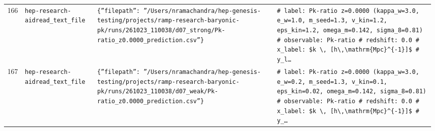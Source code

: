 \documentclass[11pt,a4paper]{article}
\begin{document}
\begin{longtable}{@{}p{}p{}p{}p{}@{}}
166 & \texttt{hep-research-aid}\newline\texttt{read\_\allowbreak{}text\_\allowbreak{}file} & \texttt{\{''filepath'':\allowbreak{} ''/\allowbreak{}Users/\allowbreak{}nramachandra/\allowbreak{}hep-genesis-testing/\allowbreak{}projects/\allowbreak{}ramp-research-baryonic-pk/\allowbreak{}runs/\allowbreak{}261023\_\allowbreak{}110038/\allowbreak{}d07\_\allowbreak{}strong/\allowbreak{}Pk-ratio\_\allowbreak{}z0.0000\_\allowbreak{}prediction.csv''\}\allowbreak{}} & \texttt{\# label:\allowbreak{} Pk-ratio z=\allowbreak{}0.0000 (kappa\_\allowbreak{}w=\allowbreak{}3.0,\allowbreak{} e\_\allowbreak{}w=\allowbreak{}1.0,\allowbreak{} m\_\allowbreak{}seed=\allowbreak{}1.3,\allowbreak{} v\_\allowbreak{}kin=\allowbreak{}1.2,\allowbreak{} eps\_\allowbreak{}kin=\allowbreak{}1.2,\allowbreak{} omega\_\allowbreak{}m=\allowbreak{}0.142,\allowbreak{} sigma\_\allowbreak{}8=\allowbreak{}0.81)\allowbreak{} \# observable:\allowbreak{} Pk-ratio \# redshift:\allowbreak{} 0.0 \# x\_\allowbreak{}label:\allowbreak{} \$k \textbackslash{}\allowbreak{},\allowbreak{} [h\textbackslash{}\allowbreak{},\allowbreak{}\textbackslash{}\allowbreak{}mathrm\{Mpc\}\allowbreak{}\textasciicircum{}\allowbreak{}\{-1\}\allowbreak{}]\allowbreak{}\$ \# y\_\allowbreak{}l\ldots{}\allowbreak{}} \\
167 & \texttt{hep-research-aid}\newline\texttt{read\_\allowbreak{}text\_\allowbreak{}file} & \texttt{\{''filepath'':\allowbreak{} ''/\allowbreak{}Users/\allowbreak{}nramachandra/\allowbreak{}hep-genesis-testing/\allowbreak{}projects/\allowbreak{}ramp-research-baryonic-pk/\allowbreak{}runs/\allowbreak{}261023\_\allowbreak{}110038/\allowbreak{}d07\_\allowbreak{}weak/\allowbreak{}Pk-ratio\_\allowbreak{}z0.0000\_\allowbreak{}prediction.csv''\}\allowbreak{}} & \texttt{\# label:\allowbreak{} Pk-ratio z=\allowbreak{}0.0000 (kappa\_\allowbreak{}w=\allowbreak{}3.0,\allowbreak{} e\_\allowbreak{}w=\allowbreak{}0.2,\allowbreak{} m\_\allowbreak{}seed=\allowbreak{}1.3,\allowbreak{} v\_\allowbreak{}kin=\allowbreak{}0.1,\allowbreak{} eps\_\allowbreak{}kin=\allowbreak{}0.02,\allowbreak{} omega\_\allowbreak{}m=\allowbreak{}0.142,\allowbreak{} sigma\_\allowbreak{}8=\allowbreak{}0.81)\allowbreak{} \# observable:\allowbreak{} Pk-ratio \# redshift:\allowbreak{} 0.0 \# x\_\allowbreak{}label:\allowbreak{} \$k \textbackslash{}\allowbreak{},\allowbreak{} [h\textbackslash{}\allowbreak{},\allowbreak{}\textbackslash{}\allowbreak{}mathrm\{Mpc\}\allowbreak{}\textasciicircum{}\allowbreak{}\{-1\}\allowbreak{}]\allowbreak{}\$ \# y\_\allowbreak{}\ldots{}\allowbreak{}} \\

\end{longtable}
\end{document}
